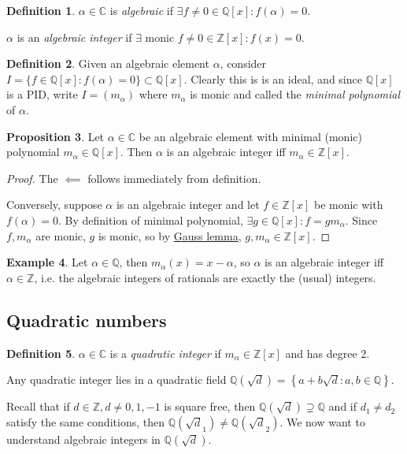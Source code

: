 \documentclass{article}
\newcommand{\Z}{\mathbb{Z}}
\newcommand{\Q}{\mathbb{Q}}
\newcommand{\C}{\mathbb{C}}
\theoremstyle{definition}
\newtheorem{defn}{Definition}[subsection]
\newtheorem{prop}[defn]{Proposition}
\newtheorem{example}[defn]{Example}
\begin{document}
\begin{defn}
$\alpha\in\C$ is \textit{algebraic} if $\exists f\neq 0\in\Q[x]:f(\alpha)=0$.

$\alpha$ is an \textit{algebraic integer} if $\exists$ monic $f\neq 0\in\Z[x]:f(x)=0$.
\end{defn}

\begin{defn}
\label{defn:minpol}
Given an algebraic element $\alpha$, consider $I=\{f\in\Q[x]:f(\alpha)=0\}\subset\Q[x]$. Clearly this is is an ideal, and since $\Q[x]$ is a PID, write $I=(m_\alpha)$ where $m_\alpha$ is monic and called the \textit{minimal polynomial} of $\alpha$.
\end{defn}

\begin{prop}
Let $\alpha\in\C$ be an algebraic element with minimal (monic) polynomial $m_\alpha\in\Q[x]$. Then $\alpha$ is an algebraic integer iff $m_\alpha\in\Z[x]$.
\end{prop}
\begin{proof}
The $\impliedby$ follows immediately from definition.

Conversely, suppose $\alpha$ is an algebraic integer and let $f\in\Z[x]$ be monic with $f(\alpha)=0$. By definition of minimal polynomial, $\exists g\in\Q[x]:f=gm_\alpha$. Since $f,m_\alpha$ are monic, $g$ is monic, so by \href{lemma:Gauss}{Gauss lemma}, $g,m_\alpha\in\Z[x]$.
\end{proof}

\begin{example}
Let $\alpha\in\Q$, then $m_\alpha(x)=x-\alpha$, so $\alpha$ is an algebraic integer iff $\alpha\in\Z$, i.e. the algebraic integers of rationals are exactly the (usual) integers.
\end{example}

\subsection{Quadratic numbers}
\begin{defn}
$\alpha\in\C$ is a \textit{quadratic integer} if $m_\alpha\in\Z[x]$ and has degree 2.

Any quadratic integer lies in a quadratic field $\Q\left(\sqrt d\right)=\left\{a+b\sqrt d:a,b\in\Q\right\}$.
\end{defn}

Recall that if $d\in\Z,d\neq 0,1,-1$ is square free, then $\Q\left(\sqrt d\right)\supsetneq \Q$ and if $d_1\neq d_2$ satisfy the same conditions, then $\Q\left(\sqrt d_1\right)\neq\Q\left(\sqrt d_2\right)$. We now want to understand algebraic integers in $\Q\left(\sqrt d\right)$.
\end{document}
